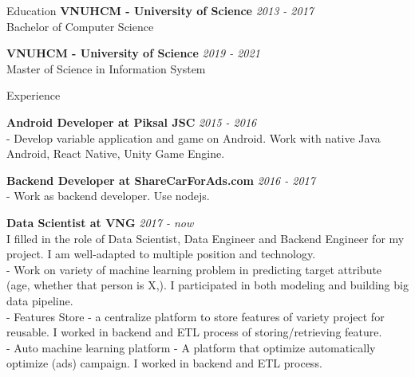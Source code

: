 \documentclass{resume} %
\begin{document}

\begin{rSection}{Education}
{\bf VNUHCM - University of Science} \hfill {\em 2013 - 2017 } 
\\ Bachelor of Computer Science %

{\bf VNUHCM - University of Science} \hfill {\em 2019 - 2021 } 
\\ Master of Science in Information System %


\end{rSection}
\begin{rSection}{Experience}

{\bf Android Developer at Piksal JSC} \hfill {\em 2015 - 2016}\\
- Develop variable application and game on Android. Work with native Java Android, React Native, Unity Game Engine.

{\bf Backend Developer at ShareCarForAds.com} \hfill {\em 2016 - 2017}\\
- Work as backend developer. Use nodejs.

{\bf Data Scientist at VNG } \hfill {\em 2017 - now}\\
I filled in the role of Data Scientist, Data Engineer and Backend Engineer for my project. I am well-adapted to multiple position and technology.
\\ - Work on variety of machine learning problem in predicting target attribute (age, whether that person is X,). I participated in both modeling and building big data pipeline. 
\\ - Features Store - a centralize platform to store features of variety project for reusable. I worked in backend and ETL process of storing/retrieving feature. 
\\ - Auto machine learning platform - A platform that optimize automatically optimize (ads) campaign.  I worked in backend and ETL process.

\end{rSection}
\end{document}

